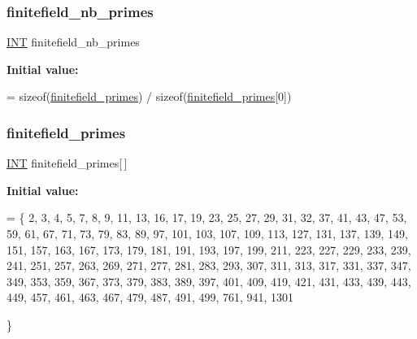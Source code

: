 \mbox{\label{finite__field__tables_8_c_abc07f79c0ab4221c5ca961123d02a550}} 
\subsubsection{\texorpdfstring{finitefield\+\_\+nb\+\_\+primes}{finitefield\_nb\_primes}}
{\footnotesize\ttfamily \mbox{\hyperlink{galois_8h_a09fddde158a3a20bd2dcadb609de11dc}{I\+NT}} finitefield\+\_\+nb\+\_\+primes}

{\bfseries Initial value\+:}
\begin{DoxyCode}
= 
    \textcolor{keyword}{sizeof}(\mbox{\hyperlink{finite__field__tables_8_c_ab55bce60e8736e8250d0c8e47e118591}{finitefield\_primes}}) / \textcolor{keyword}{sizeof}(\mbox{\hyperlink{finite__field__tables_8_c_ab55bce60e8736e8250d0c8e47e118591}{finitefield\_primes}}[0])
\end{DoxyCode}
\mbox{\label{finite__field__tables_8_c_ab55bce60e8736e8250d0c8e47e118591}} 
\subsubsection{\texorpdfstring{finitefield\+\_\+primes}{finitefield\_primes}}
{\footnotesize\ttfamily \mbox{\hyperlink{galois_8h_a09fddde158a3a20bd2dcadb609de11dc}{I\+NT}} finitefield\+\_\+primes\mbox{[}$\,$\mbox{]}}

{\bfseries Initial value\+:}
\begin{DoxyCode}
= \{
    2, 3, 4, 5, 7, 8, 9, 11, 13, 16, 
    17, 19, 23, 25, 27, 29, 31, 32, 37, 41, 
    43, 47, 53, 59, 61, 67, 71, 73, 79, 83, 
    89, 97, 101, 103, 107, 109, 113, 127, 131, 137, 
    139, 149, 151, 157, 163, 167, 173, 179, 181, 191, 
    193, 197, 199, 211, 223, 227, 229, 233, 239, 241, 
    251, 257, 263, 269, 271, 277, 281, 283, 293, 307, 
    311, 313, 317, 331, 337, 347, 349, 353, 359, 367, 
    373, 379, 383, 389, 397, 401, 409, 419, 421, 431, 
    433, 439, 443, 449, 457, 461, 463, 467, 479, 487, 
    491, 499,  761, 941, 1301


    \}
\end{DoxyCode}
\mbox{\label{finite__field__tables_8_c_ac83e19774cc0f841948d6ebdada63d04}} 
